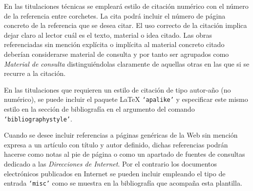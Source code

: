 En las titulaciones técnicas se empleará estilo de citación numérico con el número de la referencia entre corchetes. La cita podrá incluir el número de página concreto de la referencia que se desea citar. El uso correcto de la citación implica dejar claro al lector cuál es el texto, material o idea citado. Las obras referenciadas sin mención explícita o implícita al material concreto citado deberían considerarse material de consulta y por tanto ser agrupados como \emph{Material de consulta} distinguiéndolas claramente de aquellas otras en las que si se recurre a la citación.

En las titulaciones que requieren un estilo de citación de tipo autor-año (no numérico), se puede incluir el paquete \LaTeX{} \texttt{`apalike'} y especificar este mismo estilo en la sección de bibliografía en el argumento del comando \texttt{`bibliographystyle'}.

Cuando se desee incluir referencias a páginas genéricas de la Web sin mención expresa a un artículo con título y autor definido, dichas referencias podrán hacerse como notas al pie de página o como un apartado de fuentes de consultas dedicado a las \emph{Direcciones de Internet}. Por el contrario los documentos electrónicos publicados en Internet se pueden incluir empleando el tipo de entrada \texttt{`misc'} como se muestra en la bibliografía que acompaña esta plantilla.




